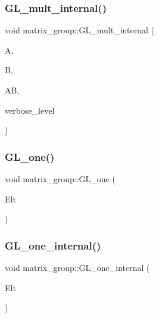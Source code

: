 \mbox{\label{classmatrix__group_aca1dcb8fefe348ee70e17c9286058658}} 
\subsubsection{\texorpdfstring{G\+L\+\_\+mult\+\_\+internal()}{GL\_mult\_internal()}}
{\footnotesize\ttfamily void matrix\+\_\+group\+::\+G\+L\+\_\+mult\+\_\+internal (\begin{DoxyParamCaption}\item[{\mbox{\hyperlink{galois_8h_a09fddde158a3a20bd2dcadb609de11dc}{I\+NT}} $\ast$}]{A,  }\item[{\mbox{\hyperlink{galois_8h_a09fddde158a3a20bd2dcadb609de11dc}{I\+NT}} $\ast$}]{B,  }\item[{\mbox{\hyperlink{galois_8h_a09fddde158a3a20bd2dcadb609de11dc}{I\+NT}} $\ast$}]{AB,  }\item[{\mbox{\hyperlink{galois_8h_a09fddde158a3a20bd2dcadb609de11dc}{I\+NT}}}]{verbose\+\_\+level }\end{DoxyParamCaption})}

\mbox{\label{classmatrix__group_a00890c674cedb856ad2c358aedb25b21}} 
\subsubsection{\texorpdfstring{G\+L\+\_\+one()}{GL\_one()}}
{\footnotesize\ttfamily void matrix\+\_\+group\+::\+G\+L\+\_\+one (\begin{DoxyParamCaption}\item[{\mbox{\hyperlink{galois_8h_a09fddde158a3a20bd2dcadb609de11dc}{I\+NT}} $\ast$}]{Elt }\end{DoxyParamCaption})}

\mbox{\label{classmatrix__group_a308f9c0bb3c627134bf6d63a5c0721e9}} 
\subsubsection{\texorpdfstring{G\+L\+\_\+one\+\_\+internal()}{GL\_one\_internal()}}
{\footnotesize\ttfamily void matrix\+\_\+group\+::\+G\+L\+\_\+one\+\_\+internal (\begin{DoxyParamCaption}\item[{\mbox{\hyperlink{galois_8h_a09fddde158a3a20bd2dcadb609de11dc}{I\+NT}} $\ast$}]{Elt }\end{DoxyParamCaption})}

